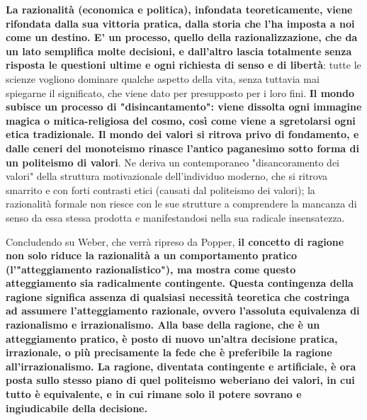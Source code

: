 \textbf{La razionalità (economica e politica), infondata teoreticamente, viene rifondata dalla sua vittoria pratica, dalla storia che l'ha imposta a noi come un destino. E' un processo, quello della razionalizzazione, che da un lato semplifica molte decisioni, e dall'altro lascia totalmente senza risposta le questioni ultime e ogni richiesta di senso e di libertà}: tutte le scienze vogliono dominare qualche aspetto della vita, senza tuttavia mai spiegarne il significato, che viene dato per presupposto per i loro fini. \textbf{Il mondo subisce un processo di "disincantamento": viene  dissolta ogni immagine magica o mitica-religiosa del cosmo, così come viene a sgretolarsi ogni etica tradizionale. Il mondo dei valori si ritrova privo di fondamento, e dalle ceneri del monoteismo rinasce  l'antico paganesimo sotto forma di un politeismo di valori}. Ne deriva un contemporaneo "disancoramento dei valori" della struttura motivazionale dell'individuo moderno, che si ritrova smarrito e con forti contrasti etici (causati dal politeismo dei valori); la razionalità formale non riesce con le sue strutture a comprendere la mancanza di senso da essa stessa prodotta e manifestandosi  nella sua radicale insensatezza.

Concludendo su Weber, che verrà ripreso da Popper, \textbf{il concetto di ragione non solo riduce la razionalità a un comportamento pratico (l'"atteggiamento razionalistico"), ma mostra come questo atteggiamento sia radicalmente contingente. Questa contingenza della ragione significa assenza di qualsiasi necessità teoretica che costringa  ad assumere l'atteggiamento razionale, ovvero l'assoluta equivalenza di razionalismo e irrazionalismo. Alla base della ragione, che è un atteggiamento pratico, è posto di nuovo un'altra decisione pratica, irrazionale, o più precisamente la fede che è preferibile la ragione all'irrazionalismo. La ragione, diventata contingente e artificiale, è ora posta sullo stesso piano di quel politeismo weberiano dei valori, in cui tutto è equivalente, e in cui rimane solo il potere sovrano e ingiudicabile della decisione.}

